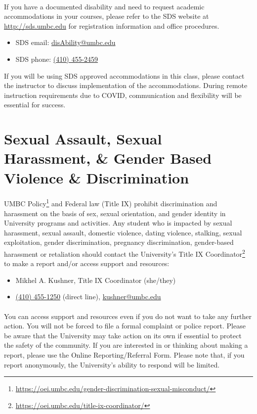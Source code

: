 \documentclass[letter,10pt]{article}
\begin{document}
\paragraph{}If you have a documented disability and need to request academic accommodations in your courses, please refer to the SDS website at \url{http://sds.umbc.edu} for registration information and office procedures.
\begin{itemize}
\item SDS email: \href{mailto:disAbility@umbc.edu}{disAbility@umbc.edu}
\item SDS phone: \href{tel:+14104552459}{(410) 455-2459}
\end{itemize}
If you will be using SDS approved accommodations in this class, please contact the instructor to discuss implementation of the accommodations. During remote instruction requirements due to COVID, communication and flexibility will be essential for success.

\section*{Sexual Assault, Sexual Harassment, \& Gender Based Violence \& Discrimination}
\paragraph{}UMBC Policy\footnote{\url{https://oei.umbc.edu/gender-discrimination-sexual-misconduct/}} and Federal law (Title IX) prohibit discrimination and harassment on the basis of sex, sexual orientation, and gender identity in University programs and activities. Any student who is impacted by sexual harassment, sexual assault, domestic violence, dating violence, stalking, sexual exploitation, gender discrimination, pregnancy discrimination, gender-based harassment or retaliation should contact the University’s Title IX Coordinator\footnote{\url{https://oei.umbc.edu/title-ix-coordinator/}} to make a report and/or access support and resources:
\begin{itemize}
\item Mikhel A. Kushner, Title IX Coordinator (she/they)
\item \href{tel:+14104551250}{(410) 455-1250} (direct line), \href{mailto:kushner@umbc.edu?Subject=Title\%20IX}{kushner@umbc.edu}
\end{itemize}

\paragraph{}You can access support and resources even if you do not want to take any further action. You will not be forced to file a formal complaint or police report. Please be aware that the University may take action on its own if essential to protect the safety of the community. If you are interested in or thinking about making a report, please use the Online Reporting/Referral Form. Please note that, if you report anonymously,  the University’s ability to respond will be limited.
\end{document}
